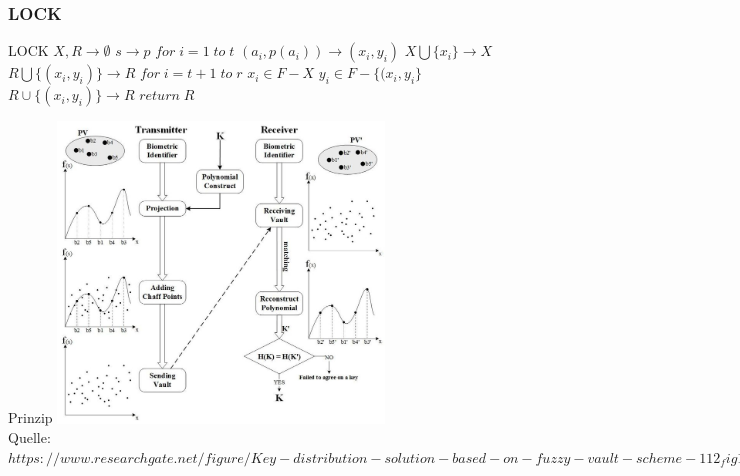 \documentclass{beamer}
\begin{document}
\subsubsection{LOCK}
\begin{frame}{LOCK}
		\hspace*{10mm}$ X,R\rightarrow \emptyset$ \newline
		\hspace*{10mm}$s \rightarrow p$\newline
		\hspace*{10mm}$for \; i=1 \; to \; t $\newline
		\hspace*{15mm}$(a_{i}, p(a_{i})) \rightarrow (x_{i}, y_{i})$\newline
		\hspace*{15mm}$X\bigcup \{x_{i}\} \rightarrow X$\newline
		\hspace*{15mm}$R\bigcup \{(x_{i},y_{i})\} \rightarrow R$\newline
		\hspace*{10mm}$for \; i=t+1 \; to \; r$\newline
		\hspace*{15mm}$x_{i} \in F - X$\newline
		\hspace*{15mm}$y_{i} \in F - \{ (x_{i},y_{i} \}$\newline
		\hspace*{15mm}$R\cup \{(x_{i},y_{i})\} \rightarrow R$\newline
		\hspace*{10mm}$return\;R$\newline
\end{frame}
\begin{frame}{Prinzip}
		\hspace{10mm}\includegraphics [height = 8cm ]{fuzzy_vault.png} \\
		\tiny{Quelle: \textit{\tiny{$https://www.researchgate.net/figure/Key-distribution-solution-based-on-fuzzy-vault-		scheme-112_fig1_321080531/$}}}
\end{frame}
\end{document}
